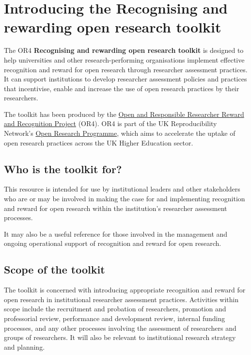 \documentclass[
  letterpaper,
  DIV=11,
  numbers=noendperiod,
  oneside]{scrreprt}
\author{}
\date{}
\renewcommand*\contentsname{Table of contents}
\newcommand\contentsname{Table of contents}
\begin{document}
\renewcommand*\contentsname{Table of contents}
{
\hypersetup{linkcolor=}
\setcounter{tocdepth}{2}
\tableofcontents
}


\chapter{Introducing the Recognising and rewarding open research
toolkit}\label{introducing-the-recognising-and-rewarding-open-research-toolkit}

The OR4 \textbf{Recognising and rewarding open research toolkit} is
designed to help universities and other research-performing
organisations implement effective recognition and reward for open
research through researcher assessment practices. It can support
institutions to develop researcher assessment policies and practices
that incentivise, enable and increase the use of open research practices
by their researchers.

The toolkit has been produced by the \href{about.qmd}{Open and
Responsible Researcher Reward and Recognition Project} (OR4). OR4 is
part of the UK Reproducibility Network's
\href{https://www.ukrn.org/open-research-programme/}{Open Research
Programme}, which aims to accelerate the uptake of open research
practices across the UK Higher Education sector.

\section{Who is the toolkit for?}\label{who-is-the-toolkit-for}

This resource is intended for use by institutional leaders and other
stakeholders who are or may be involved in making the case for and
implementing recognition and reward for open research within the
institution's researcher assessment processes.

It may also be a useful reference for those involved in the management
and ongoing operational support of recognition and reward for open
research.

\section{Scope of the toolkit}\label{scope-of-the-toolkit}

The toolkit is concerned with introducing appropriate recognition and
reward for open research in institutional researcher assessment
practices. Activities within scope include the recruitment and probation
of researchers, promotion and professorial review, performance and
development review, internal funding processes, and any other processes
involving the assessment of researchers and groups of researchers. It
will also be relevant to institutional research strategy and planning.
\end{document}
